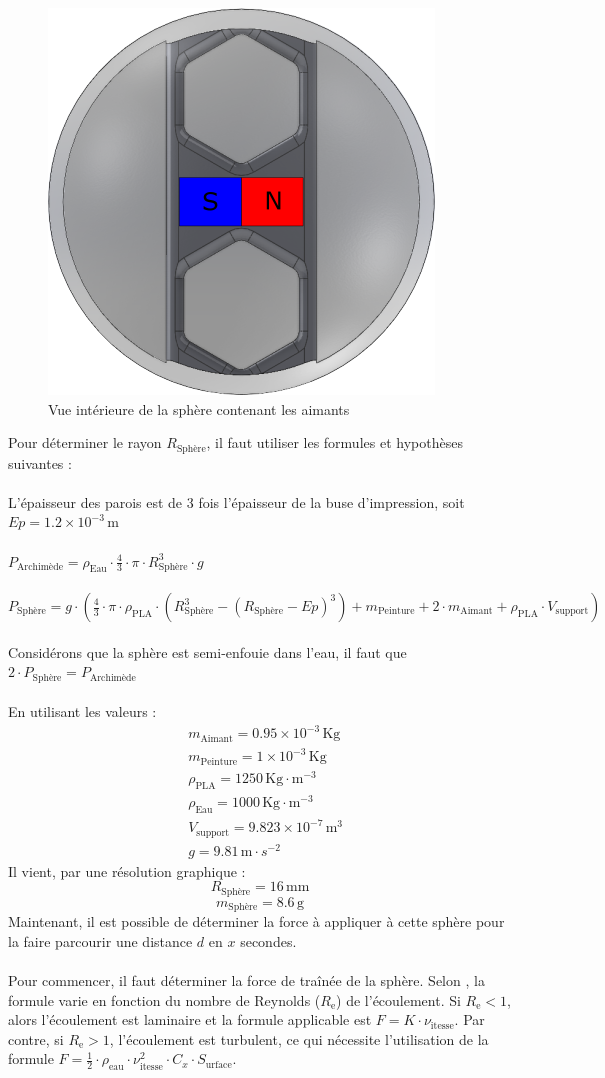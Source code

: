 \documentclass{article}
\begin{document}
\begin{figure}[H]
    \centering
    \includegraphics[width=0.25\linewidth]{Images/shema_sphere.png}
    \caption{Vue intérieure de la sphère contenant les aimants}
    \label{fig:shéma_sphère}
\end{figure}
\noindent
Pour déterminer le rayon \( R_{\text{Sphère}} \), il faut utiliser les formules et hypothèses suivantes :
\\
\\
L'épaisseur des parois est de 3 fois l'épaisseur de la buse d'impression, soit  $Ep = 1.2 \times 10^{-3}\, \text{m}$ \\\\
$P_{\text{Archimède}} = \rho_{\text{Eau}} \cdot \frac{4}{3} \cdot \pi \cdot R_{\text{Sphère}}^3 \cdot g$ \\\\
$P_{\text{Sphère}} = g \cdot (\frac{4}{3} \cdot \pi \cdot \rho_{\text{PLA}}\cdot (R_{\text{Sphère}}^3  - (R_{\text{Sphère}}-Ep)^3)  +  m_{\text{Peinture}} + 2 \cdot m_{\text{Aimant}}+\rho_{\text{PLA}} \cdot V_{\text{support}} )$ \\\\
Considérons que la sphère est semi-enfouie dans l'eau, il faut que $2 \cdot P_{\text{Sphère}} = P_{\text{Archimède}}$ 
\\
\\
En utilisant les valeurs :
\begin{align*}
    & m_{\text{Aimant}} = 0.95 \times 10^{-3}\, \text{Kg} \\
    & m_{\text{Peinture}} = 1\times 10^{-3}\, \text{Kg} \\
    & \rho_{\text{PLA}} = 1250\, \text{Kg}\cdot \text{m}^{-3} \\
    & \rho_{\text{Eau}} = 1000\, \text{Kg}\cdot \text{m}^{-3} \\
    & V_{\text{support}} = 9.823 \times 10^{-7}\, \text{m}^{3} \\
    & g = 9.81\, \text{m}\cdot {s}^{-2}
\end{align*}
Il vient, par une résolution graphique :
\[ R_{\text{Sphère}} = 16\, \text{mm} \]
\[ m_{\text{Sphère}} = 8.6\, \text{g} \]
\noindent
Maintenant, il est possible de déterminer la force à appliquer à cette sphère pour la faire parcourir une distance $d$ en $x$ secondes.\\\\Pour commencer, il faut déterminer la force de traînée de la sphère. Selon \cite{ref7}, la formule varie en fonction du nombre de Reynolds ($R_{\text{e}}$) de l'écoulement. Si $R_{\text{e}}< 1$, alors l'écoulement est laminaire et la formule applicable est $F = K\cdot \nu_{\text{itesse}}$. Par contre, si $R_{\text{e}}> 1$, l'écoulement est turbulent, ce qui nécessite l'utilisation de la formule $F= \frac{1}{2}\cdot \rho_{\text{eau}}\cdot \nu_{\text{itesse}}^2\cdot C_x\cdot S_{\text{urface}}$.
\end{document}
